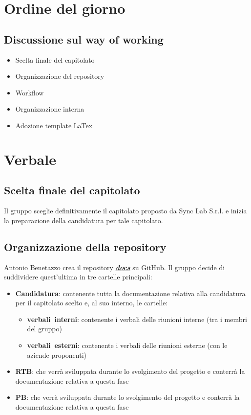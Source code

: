 \documentclass[italian,12pt]{article} %
\begin{document}
\section{Ordine del giorno}
\subsection{Discussione sul way of working}
\begin{flushleft}
	\begin{itemize}
		\item Scelta finale del capitolato
		\item Organizzazione del repository
		\item Workflow
		\item Organizzazione interna
		\item Adozione template LaTex
	\end{itemize}
\end{flushleft}


\newpage

\section{Verbale}
\subsection{Scelta finale del capitolato}
\begin{flushleft}
	Il gruppo sceglie definitivamente il capitolato proposto da Sync Lab S.r.l. e inizia la preparazione della candidatura per tale capitolato.
\end{flushleft}
\subsection{Organizzazione della repository}
\begin{flushleft}
	Antonio Benetazzo crea il repository \href{https://github.com/7Last/docs}{ \textbf{\textit{docs}}} su GitHub.
	Il gruppo decide di suddividere quest'ultima in tre cartelle principali: 
	\begin{itemize}
		\item \textbf{Candidatura}: contenente tutta la documentazione relativa alla candidatura per il capitolato scelto e, al suo interno, le cartelle:
		\begin{itemize}
			\item \textbf{verbali\ interni}: contenente i verbali delle riunioni interne (tra i membri del gruppo)
			\item \textbf{verbali\ esterni}: contenente i verbali delle riunioni esterne (con le aziende proponenti)
			\end{itemize}
		\item \textbf{RTB}: che verrà sviluppata durante lo svolgimento del progetto e conterrà la documentazione relativa a questa fase
		\item \textbf{PB}: che verrà sviluppata durante lo svolgimento del progetto e conterrà la documentazione relativa a questa fase
	\end{itemize}
\end{flushleft}
\end{document}
